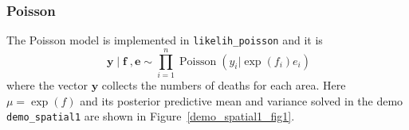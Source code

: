 \documentclass[twoside,11pt]{article}
\DeclareMathOperator{\f}{\mathbf{f}}
\DeclareMathOperator{\y}{\mathbf{y}}
\DeclareMathOperator{\Poisson}{Poisson}
\newcommand{\mb}{\mathbf}
\newcommand{\code}[1]{{\normalfont\texttt{#1}}}
\begin{document}
\subsubsection{Poisson}

The Poisson model is implemented in \code{likelih\_poisson} and
it is
%
\begin{equation}
 \y|\f,\mb{e}  \sim \prod_{i=1}^{n} \Poisson(y_i|\exp(f_i)e_i) \label{Poisson_likelihood}
\end{equation}
%
where the vector $\mb{y}$ collects the numbers of deaths for each
area. Here $\mu=\exp(f)$ and its posterior predictive mean and
variance solved in the demo \code{demo\_spatial1} are shown in
Figure~\ref{demo_spatial1_fig1}.
\end{document}
